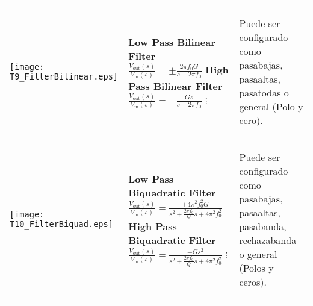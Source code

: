 \begin{table}[!ht]
\begin{tabular}{>{\centering\arraybackslash}m{3cm} >{\centering\arraybackslash}m{5cm} >{\centering\arraybackslash}m{5cm}}
    {\scriptsize \textbf{FilterBilinear}} \linebreak
    \texttt{[image: T9\_FilterBilinear.eps]}
    &
      \begin{scriptsize}
		 \textbf{Low Pass Bilinear Filter} \linebreak
      	 $\frac{V_{\mathrm{out}}(s)}{V_{\mathrm{in}}(s)} = \pm \frac{2 \pi f_{0} G}{s + 2 \pi f_{0}}$ \linebreak
      	 \textbf{High Pass Bilinear Filter} \linebreak
      	 $\frac{V_{\mathrm{out}}(s)}{V_{\mathrm{in}}(s)} = - \frac{Gs}{s + 2 \pi f_{0}}$ \linebreak
      	 $\vdots$
      \end{scriptsize}
    & 
      \begin{itemize}[leftmargin=0cm,noitemsep]
      \begin{scriptsize}
		\item[] Puede ser configurado como pasabajas, pasaaltas, pasatodas o general (Polo y cero).
      \end{scriptsize}
      \end{itemize}
    \\ %
    {\scriptsize \textbf{FilterBiquad}} \linebreak
    \texttt{[image: T10\_FilterBiquad.eps]}
    &
      \begin{scriptsize}
		 \textbf{Low Pass Biquadratic Filter} \linebreak
      	 $\frac{V_{\mathrm{out}}(s)}{V_{\mathrm{in}}(s)} = \frac{\pm 4 \pi^{2} f_{0}^{2} G}{s^{2} + \frac{2 \pi f_{0}}{Q}s + 4 \pi^{2} f_{0}^{2}}$ \linebreak
      	 \textbf{High Pass Biquadratic Filter} \linebreak
      	 $\frac{V_{\mathrm{out}}(s)}{V_{\mathrm{in}}(s)} = \frac{-G s^{2}}{s^{2} + \frac{2 \pi f_{0}}{Q} s + 4 \pi^{2} f_{0}^{2}}$ \linebreak
      	 $\vdots$
      \end{scriptsize}
    & 
      \begin{itemize}[leftmargin=0cm,noitemsep]
      \begin{scriptsize}
		\item[] Puede ser configurado como pasabajas, pasaaltas, pasabanda, rechazabanda o general (Polos y ceros).
      \end{scriptsize}
      \end{itemize}
    \\ %
    \hline
  \end{tabular}
\end{table}
	
